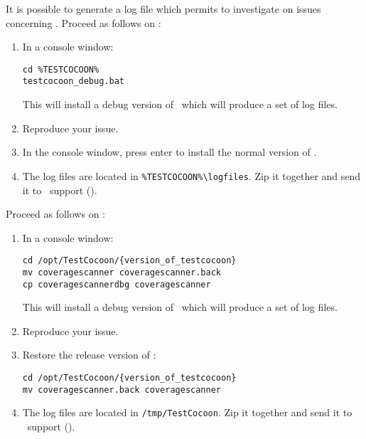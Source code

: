 It is possible to generate a log file which permits to investigate on issues concerning \CoverageScanner. Proceed as follows on \MicrosoftWindows:
\begin{enumerate}
\item In a console window:
\begin{verbatim}
cd %TESTCOCOON%
testcocoon_debug.bat
\end{verbatim}

This will install a debug version of \CoverageScanner\ which will produce a set of log files.
\item Reproduce your issue.
\item In the console window, press enter to install the normal version of \CoverageScanner.
\item The log files are located in \verb$%TESTCOCOON%\logfiles$. Zip it together and send it to \TestCocoon\ support ().
\end{enumerate}

Proceed as follows on \Linux:
\begin{enumerate}
\item In a console window:
\begin{verbatim}
cd /opt/TestCocoon/{version_of_testcocoon}
mv coveragescanner coveragescanner.back
cp coveragescannerdbg coveragescanner
\end{verbatim}

This will install a debug version of \CoverageScanner\ which will produce a set of log files.
\item Reproduce your issue.
\item Restore the release version of \CoverageScanner:
\begin{verbatim}
cd /opt/TestCocoon/{version_of_testcocoon}
mv coveragescanner.back coveragescanner 
\end{verbatim}
\item The log files are located in \verb$/tmp/TestCocoon$. Zip it together and send it to \TestCocoon\ support ().
\end{enumerate}



